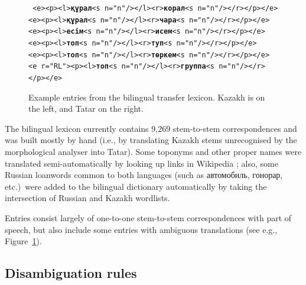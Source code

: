 \documentclass[a4paper,11pt]{article}
\begin{document}
	
\begin{figure}[bhtp]
\hspace{3cm}\parbox[t]{0.7\textwidth}{{\tt
    <e><p><l>\textbf{құрал}<s n="n"/></l><r>\textbf{корал}<s n="n"/></r></p></e> \\
    <e><p><l>\textbf{құрал}<s n="n"/></l><r>\textbf{чара}<s n="n"/></r></p></e> \\
    <e><p><l>\textbf{есім}<s n="n"/></l><r>\textbf{исем}<s n="n"/></r></p></e> \\
    <e><p><l>\textbf{топ}<s n="n"/></l><r>\textbf{туп}<s n="n"/></r></p></e> \\
    <e><p><l>\textbf{топ}<s n="n"/></l><r>\textbf{төркем}<s n="n"/></r></p></e> \\
    <e r="RL"><p><l>\textbf{топ}<s n="n"/></l><r>\textbf{группа}<s n="n"/></r></p></e>
}}%
\vspace{-0.5em}
\caption{Example entries from the bilingual transfer lexicon. Kazakh is on the left, and Tatar on the right.}
\label{fig:bidix}
\end{figure}

The bilingual lexicon currently contains 9,269 stem-to-stem correspondences and was built mostly 
by hand (i.e., by translating Kazakh stems unrecognised by the morphological analyser into Tatar).  Some 
toponyms and other proper names were translated semi-automatically by looking up links in Wikipedia \citep{tyers08}; also, 
some Russian loanwords common to both languages (such as автомобиль, гонорар, etc.)\ were added to the bilingual 
dictionary automatically by taking the intersection of Russian and Kazakh wordlists.

Entries consist largely of one-to-one stem-to-stem correspondences with part of speech, but also include some entries with ambiguous translations (see e.g., Figure~\ref{fig:bidix}).

\subsection{Disambiguation rules}
\end{document}
